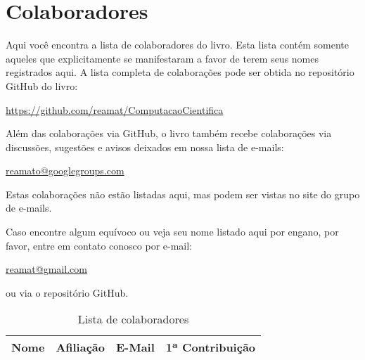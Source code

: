 
%
%
%

\chapter*{Colaboradores}
\fancyhead[LE,RO]{\thepage}

Aqui você encontra a lista de colaboradores do livro. Esta lista contém somente aqueles que explicitamente se manifestaram a favor de terem seus nomes registrados aqui. A lista completa de colaborações pode ser obtida no repositório GitHub do livro:
\begin{center}
  \url{https://github.com/reamat/ComputacaoCientifica}
\end{center}
Além das colaborações via GitHub, o livro também recebe colaborações via discussões, sugestões e avisos deixados em nossa lista de e-mails:
\begin{center}
\url{reamato@googlegroups.com}
\end{center}
Estas colaborações não estão listadas aqui, mas podem ser vistas no site do grupo de e-mails.

Caso encontre algum equívoco ou veja seu nome listado aqui por engano, por favor, entre em contato conosco por e-mail:
\begin{center}
  \url{reamat@gmail.com}
\end{center}
ou via o repositório GitHub.

\begin{table}[h!]
  \centering
  \caption{Lista de colaboradores}
  \label{tab:colaboradores}
  \begin{tabular}{llll} \hline
    Nome & Afiliação & E-Mail & 1ª Contribuição\\ \hline

    \hline
  \end{tabular}
\end{table}
